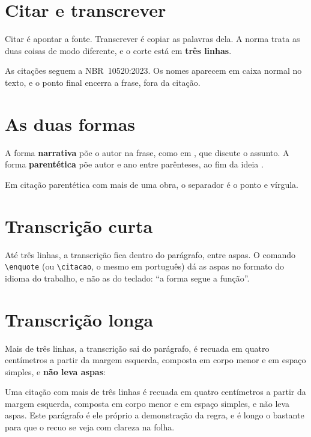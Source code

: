 \documentclass[dsc]{ufrj}
\begin{document}
  \section{Citar e transcrever}

  Citar é apontar a fonte. Transcrever é copiar as palavras dela. A norma trata
  as duas coisas de modo diferente, e o corte está em \textbf{três linhas}.

  As citações seguem a \mbox{NBR~10520:2023}. Os nomes aparecem em caixa normal
  no texto, e o ponto final encerra a frase, fora da citação.

  \section{As duas formas}

  A forma \textbf{narrativa} põe o autor na frase, como em
  \citet{article-example}, que discute o assunto. A forma \textbf{parentética}
  põe autor e ano entre parênteses, ao fim da ideia \citep{book-example}.

  Em citação parentética com mais de uma obra, o separador é o ponto e vírgula.

  \section{Transcrição curta}

  Até três linhas, a transcrição fica dentro do parágrafo, entre aspas. O comando
  \verb|\enquote| (ou \verb|\citacao|, o mesmo em português) dá as aspas no
  formato do idioma do trabalho, e não as do teclado: \enquote{a forma segue a
  função}.

  \section{Transcrição longa}

  Mais de três linhas, a transcrição sai do parágrafo, é recuada em quatro
  centímetros a partir da margem esquerda, composta em corpo menor e em espaço
  simples, e \textbf{não leva aspas}:

  \begin{longquote}
    Uma citação com mais de três linhas é recuada em quatro centímetros a partir
    da margem esquerda, composta em corpo menor e em espaço simples, e não leva
    aspas. Este parágrafo é ele próprio a demonstração da regra, e é longo o
    bastante para que o recuo se veja com clareza na folha.
  \end{longquote}
\end{document}
